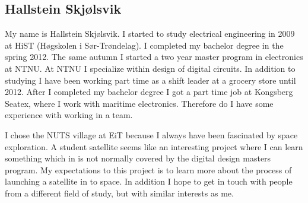 \subsection{Hallstein Skjølsvik}
My name is Hallstein Skjølsvik. I started to study electrical engineering in 2009 at HiST (Høgskolen i Sør-Trøndelag). I completed my bachelor degree in the spring 2012. The same autumn I started a two year master program in electronics at NTNU. At NTNU I specialize within design of digital circuits. In addition to studying I have been working part time as a shift leader at a grocery store until 2012. After I completed my bachelor degree I got a part time job at Kongsberg Seatex, where I work with maritime electronics. Therefore do I have some experience with working in a team. 

I chose the NUTS village at EiT because I always have been fascinated by space exploration. A student satellite seems like an interesting project where I can learn something which in is not normally covered by the digital design masters program. My expectations to this project is to learn more about the process of launching a satellite in to space. In addition I hope to get in touch with people from a different field of study, but with similar interests as me.
